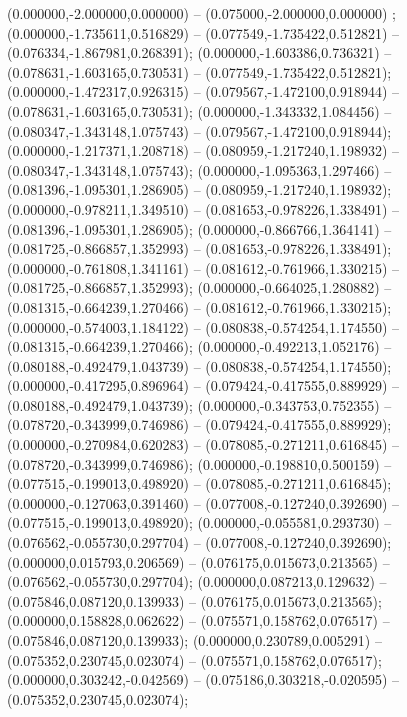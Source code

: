  (0.000000,-2.000000,0.000000) -- (0.075000,-2.000000,0.000000) ;
 (0.000000,-1.735611,0.516829) -- (0.077549,-1.735422,0.512821) -- (0.076334,-1.867981,0.268391);
 (0.000000,-1.603386,0.736321) -- (0.078631,-1.603165,0.730531) -- (0.077549,-1.735422,0.512821);
 (0.000000,-1.472317,0.926315) -- (0.079567,-1.472100,0.918944) -- (0.078631,-1.603165,0.730531);
 (0.000000,-1.343332,1.084456) -- (0.080347,-1.343148,1.075743) -- (0.079567,-1.472100,0.918944);
 (0.000000,-1.217371,1.208718) -- (0.080959,-1.217240,1.198932) -- (0.080347,-1.343148,1.075743);
 (0.000000,-1.095363,1.297466) -- (0.081396,-1.095301,1.286905) -- (0.080959,-1.217240,1.198932);
 (0.000000,-0.978211,1.349510) -- (0.081653,-0.978226,1.338491) -- (0.081396,-1.095301,1.286905);
 (0.000000,-0.866766,1.364141) -- (0.081725,-0.866857,1.352993) -- (0.081653,-0.978226,1.338491);
 (0.000000,-0.761808,1.341161) -- (0.081612,-0.761966,1.330215) -- (0.081725,-0.866857,1.352993);
 (0.000000,-0.664025,1.280882) -- (0.081315,-0.664239,1.270466) -- (0.081612,-0.761966,1.330215);
 (0.000000,-0.574003,1.184122) -- (0.080838,-0.574254,1.174550) -- (0.081315,-0.664239,1.270466);
 (0.000000,-0.492213,1.052176) -- (0.080188,-0.492479,1.043739) -- (0.080838,-0.574254,1.174550);
 (0.000000,-0.417295,0.896964) -- (0.079424,-0.417555,0.889929) -- (0.080188,-0.492479,1.043739);
 (0.000000,-0.343753,0.752355) -- (0.078720,-0.343999,0.746986) -- (0.079424,-0.417555,0.889929);
 (0.000000,-0.270984,0.620283) -- (0.078085,-0.271211,0.616845) -- (0.078720,-0.343999,0.746986);
 (0.000000,-0.198810,0.500159) -- (0.077515,-0.199013,0.498920) -- (0.078085,-0.271211,0.616845);
 (0.000000,-0.127063,0.391460) -- (0.077008,-0.127240,0.392690) -- (0.077515,-0.199013,0.498920);
 (0.000000,-0.055581,0.293730) -- (0.076562,-0.055730,0.297704) -- (0.077008,-0.127240,0.392690);
 (0.000000,0.015793,0.206569) -- (0.076175,0.015673,0.213565) -- (0.076562,-0.055730,0.297704);
 (0.000000,0.087213,0.129632) -- (0.075846,0.087120,0.139933) -- (0.076175,0.015673,0.213565);
 (0.000000,0.158828,0.062622) -- (0.075571,0.158762,0.076517) -- (0.075846,0.087120,0.139933);
 (0.000000,0.230789,0.005291) -- (0.075352,0.230745,0.023074) -- (0.075571,0.158762,0.076517);
 (0.000000,0.303242,-0.042569) -- (0.075186,0.303218,-0.020595) -- (0.075352,0.230745,0.023074);
